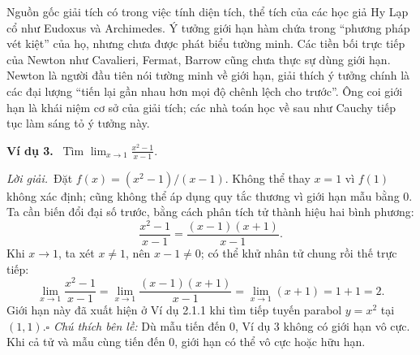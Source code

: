 \documentclass[12pt,a4paper]{article}
\newcommand{\ex}[1]{\par\medskip\noindent\textbf{Ví dụ #1.}\ }
\newcommand{\sol}{\par\noindent\textit{Lời giải.}\ }
\begin{document}
Nguồn gốc giải tích có trong việc tính diện tích, thể tích của các học giả Hy Lạp cổ như Eudoxus và Archimedes. Ý tưởng giới hạn hàm chứa trong ``phương pháp vét kiệt'' của họ, nhưng chưa được phát biểu tường minh. Các tiền bối trực tiếp của Newton như Cavalieri, Fermat, Barrow cũng chưa thực sự dùng giới hạn. Newton là người đầu tiên nói tường minh về giới hạn, giải thích ý tưởng chính là các đại lượng ``tiến lại gần nhau hơn mọi độ chênh lệch cho trước''. Ông coi giới hạn là khái niệm cơ sở của giải tích; các nhà toán học về sau như Cauchy tiếp tục làm sáng tỏ ý tưởng này.
\ex{3} Tìm $\displaystyle\lim_{x\to1}\frac{x^2-1}{x-1}$.
\sol Đặt $f(x)=(x^2-1)/(x-1)$. Không thể thay $x=1$ vì $f(1)$ không xác định; cũng không thể áp dụng quy tắc thương vì giới hạn mẫu bằng 0. Ta cần biến đổi đại số trước, bằng cách phân tích tử thành hiệu hai bình phương:
\[\frac{x^2-1}{x-1}=\frac{(x-1)(x+1)}{x-1}.\]
Khi $x\to1$, ta xét $x\ne1$, nên $x-1\ne0$; có thể khử nhân tử chung rồi thế trực tiếp:
\[\lim_{x\to1}\frac{x^2-1}{x-1}=\lim_{x\to1}\frac{(x-1)(x+1)}{x-1}=\lim_{x\to1}(x+1)=1+1=2.\]
Giới hạn này đã xuất hiện ở Ví dụ 2.1.1 khi tìm tiếp tuyến parabol $y=x^2$ tại $(1,1)$.\hfill$\square$
\noindent\textit{Chú thích bên lề:} Dù mẫu tiến đến 0, Ví dụ 3 không có giới hạn vô cực. Khi cả tử và mẫu cùng tiến đến 0, giới hạn có thể vô cực hoặc hữu hạn.
\end{document}
